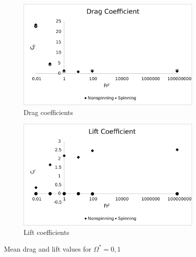 \begin{figure}
    \centering
    \begin{subfigure}[b]{0.49\textwidth}
        \centering
        \includegraphics[width=\textwidth]{images/circle/ar1drag.eps}
        \caption{Drag coefficients}
        \label{fig:ar1drag}
    \end{subfigure}
    \hfill
    \begin{subfigure}[b]{0.49\textwidth}
        \centering
        \includegraphics[width=\textwidth]{images/circle/ar1lift.eps}
        \caption{Lift coefficients}
        \label{fig:ar1lift}
    \end{subfigure}
    \caption{Mean drag and lift values for $\Omega^{\ast} = {0,1}$}
    \label{fig:circleforces}
\end{figure} 
